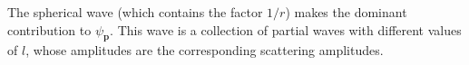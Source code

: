 The spherical wave (which contains the factor $1/r$) makes the dominant contribution to $\psi_{\mathbf p}$. This wave is a collection of partial waves with different values of $l$, whose amplitudes are the corresponding scattering amplitudes.
